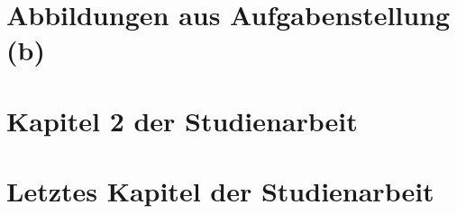\documentclass[htwLogo]{HTWself}
\begin{document}
\HTWCover %
\HTWListsOfx %

\chapter{Abbildungen aus Aufgabenstellung (b)}
\DisplayContent %

\chapter{Kapitel 2 der Studienarbeit}
\blindtext[5]

\chapter{Letztes Kapitel der Studienarbeit}
\blindtext[5]
\end{document}

